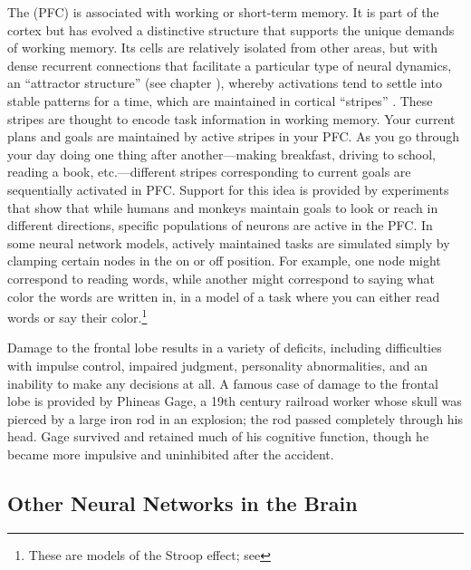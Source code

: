 The  (PFC) is associated with working or short-term memory. It is part of the cortex but has evolved a distinctive structure that supports the unique demands of working memory. Its cells are relatively isolated from other areas, but with dense recurrent connections that facilitate a particular type of neural dynamics, an ``attractor structure'' (see chapter ), whereby activations tend to settle into stable patterns for a time, which are maintained in cortical ``stripes'' \cite{kriete2013indirection}. These stripes are thought to encode task information in working memory. Your current plans and goals are maintained by active stripes in your PFC. As you go through your day doing one thing after another---making breakfast, driving to school, reading a book, etc.---different stripes corresponding to current goals are sequentially activated in PFC. Support for this idea is provided by experiments that show that while humans and monkeys maintain goals to look or reach in different directions, specific populations of neurons are active in the PFC. In some neural network models, actively maintained tasks are simulated simply by clamping certain nodes in the on or off position. For example, one node might correspond to reading words, while another might correspond to saying what color the words are written in, in a model of a task where you can either read words or say their color.\footnote{These are models of the Stroop effect; see }

 Damage to the frontal lobe results in a variety of deficits, including difficulties with impulse control, impaired judgment, personality abnormalities, and an inability to make any decisions at all. A famous case of damage to the frontal lobe is provided by Phineas Gage, a 19th century railroad worker whose skull was pierced by a large iron rod in an explosion; the rod passed completely through his head. Gage survived and retained much of his cognitive function, though he became more impulsive and uninhibited after the accident.

\subsection{Other Neural Networks in the Brain }

